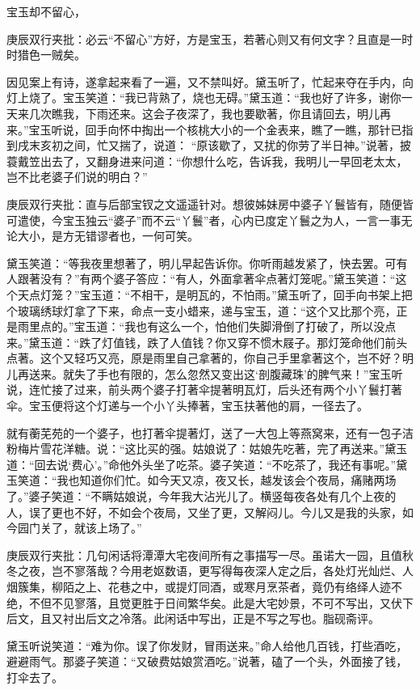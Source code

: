 \begin{parag}


    宝玉却不留心，\begin{note}庚辰双行夹批：必云“不留心”方好，方是宝玉，若著心则又有何文字？且直是一时时猎色一贼矣。\end{note}因见案上有诗，遂拿起来看了一遍，又不禁叫好。黛玉听了，忙起来夺在手内，向灯上烧了。宝玉笑道：“我已背熟了，烧也无碍。”黛玉道：“我也好了许多，谢你一天来几次瞧我，下雨还来。这会子夜深了，我也要歇著，你且请回去，明儿再来。”宝玉听说，回手向怀中掏出一个核桃大小的一个金表来，瞧了一瞧，那针已指到戌末亥初之间，忙又揣了，说道： “原该歇了，又扰的你劳了半日神。”说著，披蓑戴笠出去了，又翻身进来问道：“你想什么吃，告诉我，我明儿一早回老太太，岂不比老婆子们说的明白？”\begin{note}庚辰双行夹批：直与后部宝钗之文遥遥针对。想彼姊妹房中婆子丫鬟皆有，随便皆可遣使，今宝玉独云“婆子”而不云“丫鬟”者，心内已度定丫鬟之为人，一言一事无论大小，是方无错谬者也，一何可笑。\end{note}黛玉笑道：“等我夜里想著了，明儿早起告诉你。你听雨越发紧了，快去罢。可有人跟著没有？”有两个婆子答应：“有人，外面拿著伞点著灯笼呢。”黛玉笑道：“这个天点灯笼？”宝玉道：“不相干，是明瓦的，不怕雨。”黛玉听了，回手向书架上把个玻璃绣球灯拿了下来，命点一支小蜡来，递与宝玉，道：“这个又比那个亮，正是雨里点的。”宝玉道：“我也有这么一个，怕他们失脚滑倒了打破了，所以没点来。”黛玉道：“跌了灯值钱，跌了人值钱？你又穿不惯木屐子。那灯笼命他们前头点著。这个又轻巧又亮，原是雨里自己拿著的，你自己手里拿著这个，岂不好？明儿再送来。就失了手也有限的，怎么忽然又变出这‘剖腹藏珠’的脾气来！”宝玉听说，连忙接了过来，前头两个婆子打著伞提著明瓦灯，后头还有两个小丫鬟打著伞。宝玉便将这个灯递与一个小丫头捧著，宝玉扶著他的肩，一径去了。
\end{parag}


\begin{parag}


    就有蘅芜苑的一个婆子，也打著伞提著灯，送了一大包上等燕窝来，还有一包子洁粉梅片雪花洋糖。说：“这比买的强。姑娘说了：姑娘先吃著，完了再送来。”黛玉道：“回去说‘费心’。”命他外头坐了吃茶。婆子笑道：“不吃茶了，我还有事呢。”黛玉笑道：“我也知道你们忙。如今天又凉，夜又长，越发该会个夜局，痛赌两场了。”婆子笑道：“不瞒姑娘说，今年我大沾光儿了。横竖每夜各处有几个上夜的人，误了更也不好，不如会个夜局，又坐了更，又解闷儿。今儿又是我的头家，如今园门关了，就该上场了。”\begin{note}庚辰双行夹批：几句闲话将潭潭大宅夜间所有之事描写一尽。虽诺大一园，且值秋冬之夜，岂不寥落哉？今用老妪数语，更写得每夜深人定之后，各处灯光灿烂、人烟簇集，柳陌之上、花巷之中，或提灯同酒，或寒月烹茶者，竟仍有络绎人迹不绝，不但不见寥落，且觉更胜于日间繁华矣。此是大宅妙景，不可不写出，又伏下后文，且又衬出后文之冷落。此闲话中写出，正是不写之写也。脂砚斋评。\end{note}黛玉听说笑道：“难为你。误了你发财，冒雨送来。”命人给他几百钱，打些酒吃，避避雨气。那婆子笑道：“又破费姑娘赏酒吃。”说著，磕了一个头，外面接了钱，打伞去了。
\end{parag}


